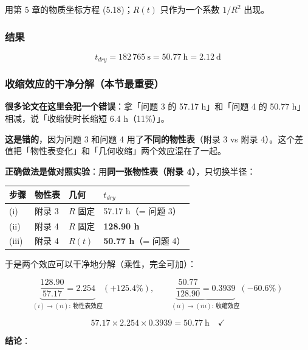 用第 5 章的物质坐标方程 (5.18)；$R(t)$ 只作为一个系数 $1/R^2$ 出现。


\subsubsection{结果}


\begin{equation}
t_{dry}=182\,765\ \mathrm s=50.77\ \mathrm h=2.12\ \mathrm d\tag{10.3}
\end{equation}


\subsubsection{收缩效应的干净分解（本节最重要）}


\textbf{很多论文在这里会犯一个错误}：拿「问题 3 的 57.17 h」和「问题 4 的 50.77 h」相减，说「收缩使时长缩短 6.4 h（11\%）」。


\textbf{这是错的}，因为问题 3 和问题 4 用了\textbf{不同的物性表}（附录 3 vs 附录 4）。这个差值把「物性表变化」和「几何收缩」两个效应混在了一起。


\textbf{正确做法是做对照实验}：用\textbf{同一张物性表（附录 4）}，只切换半径：


\begin{center}
\small
\begin{tabular}{llll}
\toprule
步骤 & 物性表 & 几何 & $t_{dry}$ \\
\midrule
(i) & 附录 3 & $R$ 固定 & 57.17 h（= 问题 3） \\
(ii) & 附录 4 & $R$ 固定 & \textbf{128.90 h} \\
(iii) & 附录 4 & $R(t)$ & \textbf{50.77 h}（= 问题 4） \\
\bottomrule
\end{tabular}
\end{center}


于是两个效应可以干净地分解（乘性，完全可加）：


\begin{equation*}
\underbrace{\frac{128.90}{57.17}=2.254}_{(i)\to(ii):\ \text{物性表效应}}(+125.4\%),\qquad
\underbrace{\frac{50.77}{128.90}=0.3939}_{(ii)\to(iii):\ \text{收缩效应}}(\mathbf{-60.6\%})
\end{equation*}


\begin{equation*}
57.17\times2.254\times0.3939=50.77\ \mathrm h\quad\checkmark
\end{equation*}


\textbf{结论}：


